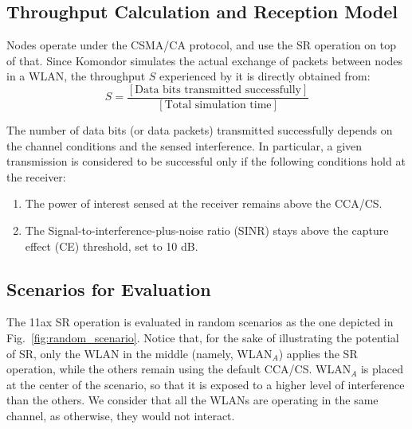 \documentclass[conference]{IEEEtran}
\begin{document}
	\subsection{Throughput Calculation and Reception Model}
	
	Nodes operate under the CSMA/CA protocol, and use the SR operation on top of that. Since Komondor simulates the actual exchange of packets between nodes in a WLAN, the throughput $S$ experienced by it is directly obtained from:
	\begin{equation}
	S = \frac{[\text{Data bits transmitted successfully}]}{[\text{Total simulation time}]}
	\nonumber
	\end{equation}
	
	The number of data bits (or data packets) transmitted successfully depends on the channel conditions and the sensed interference. In particular, a given transmission is considered to be successful only if the following conditions hold at the receiver:
	\begin{enumerate}
		\item The power of interest sensed at the receiver remains above the CCA/CS.
		\item The Signal-to-interference-plus-noise ratio (SINR) stays above the capture effect (CE) threshold, set to 10 dB.
	\end{enumerate}
	
	\subsection{Scenarios for Evaluation}
	
	The 11ax SR operation is evaluated in random scenarios as the one depicted in Fig.~\ref{fig:random_scenario}. Notice that, for the sake of illustrating the potential of SR, only the WLAN in the middle (namely, WLAN$_A$) applies the SR operation, while the others remain using the default CCA/CS. WLAN$_A$ is placed at the center of the scenario, so that it is exposed to a higher level of interference than the others. We consider that all the WLANs are operating in the same channel, as otherwise, they would not interact.
	
\end{document}
